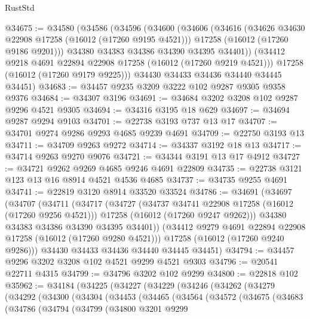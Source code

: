 \begin{lexlean}{RustStd}
\begin{coremodule}
@34675 := @34580
    (@34586
      (@34596
        (@34600
          (@34606
            (@34616
              (@34626 @34630 @22908 @17258 (@16012 (@17260 @9195 @4521)))
              @17258
              (@16012 (@17260 @9186 @9201)))
            @34380
            @34383
            @34386
            @34390
            @34395
            @34401))
        (@34412 @9218 @4691 @22894 @22908 @17258 (@16012 (@17260 @9219 @4521)))
        @17258
        (@16012 (@17260 @9179 @9225)))
      @34430
      @34433
      @34436
      @34440
      @34445
      @34451)
@34683 := @34457 @9235 @3209 @3222 @102 @9287 @9305 @9358 @9376
@34684 := @34307 @3196
@34691 := @34684 @3202 @3208 @102 @9287 @9296 @4521 @9305
@34694 := @34316 @3195 @18 @629
@34697 := @34694 @9287 @9294 @9103
@34701 := @22738 @3193 @737 @13 @17
@34707 := @34701 @9274 @9286 @9293 @4685 @9239 @4691
@34709 := @22750 @3193 @13
@34711 := @34709 @9263 @9272
@34714 := @34337 @3192 @18 @13
@34717 := @34714 @9263 @9270 @9076
@34721 := @34344 @3191 @13 @17 @4912
@34727 := @34721 @9262 @9269 @4685 @9246 @4691 @22809
@34735 := @22738 @3121 @123 @13 @16 @8914 @4521 @4536 @4685
@34737 := @34735 @9255 @4691
@34741 := @22819 @3120 @8914 @33520 @33524
@34786 := @34691
    (@34697
      (@34707
        (@34711
          (@34717
            (@34727
              (@34737 @34741 @22908 @17258 (@16012 (@17260 @9256 @4521)))
              @17258
              (@16012 (@17260 @9247 @9262)))
            @34380
            @34383
            @34386
            @34390
            @34395
            @34401))
        (@34412 @9279 @4691 @22894 @22908 @17258 (@16012 (@17260 @9280 @4521)))
        @17258
        (@16012 (@17260 @9240 @9286)))
      @34430
      @34433
      @34436
      @34440
      @34445
      @34451)
@34794 := @34457 @9296 @3202 @3208 @102 @4521 @9299 @4521 @9303
@34796 := @20541 @22711 @4315
@34799 := @34796 @3202 @102 @9299
@34800 := @22818 @102
@35962 := @34184
    (@34225
      (@34227
        (@34229
          (@34246
            (@34262
              (@34279
                (@34292
                  (@34300
                    (@34304
                      (@34453
                        (@34465
                          (@34564
                            (@34572
                              (@34675
                                (@34683
                                  (@34786
                                    (@34794
                                      (@34799
                                        (@34800
                                          @3201
                                          @9299

\end{coremodule}
\end{lexlean}
